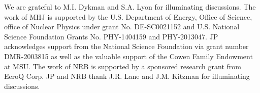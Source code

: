 \documentclass[twocolumn,superscriptaddress,unsortedaddress,
 amsmath,amssymb,
 aps,
]{revtex4-2}
\begin{document}
\begin{acknowledgments}
We are grateful to M.I. Dykman and S.A. Lyon for illuminating discussions. The work of MHJ is supported by the U.S. Department of Energy, Office of Science, office of Nuclear Physics under grant No. DE-SC0021152 and U.S. National Science Foundation Grants No. PHY-1404159 and PHY-2013047. JP acknowledges support from the National Science Foundation via grant number DMR-2003815 as well as the valuable support of the Cowen Family Endowment at MSU. The work of NRB is supported by a sponsored research grant from EeroQ Corp. JP and NRB thank J.R. Lane and J.M. Kitzman for illuminating discussions.
\end{acknowledgments}
\end{document}
